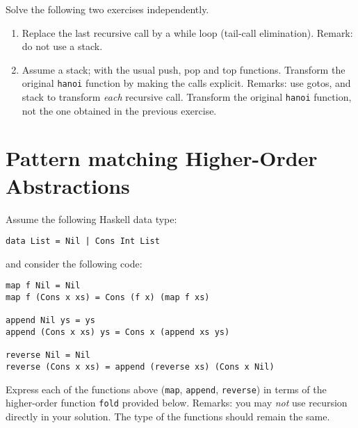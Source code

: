 \documentclass{article}
\newcommand{\answer}[1]{}
\begin{document}
Solve the following two exercises independently.
\begin{enumerate}
\item Replace the last recursive call by a while loop (tail-call
  elimination). Remark: do not use a stack. 
  \answer{
    \begin{verbatim}
    void move_many(int n, int source, int intermediate, int target) {
      while (n > 0) {
        move_many(n-1,source,target,intermediate);
        move_disk(source,target);
        n = n-1;
        swap(source,intermediate);
      }
    }
    \end{verbatim}}
\item Assume a stack; with the usual push, pop and top
  functions. Transform the original \texttt{hanoi} function by making
  the calls explicit. Remarks: use gotos, and stack to transform \emph{each}
  recursive call. Transform the original \texttt{hanoi} function, not
  the one obtained in the previous exercise. 
  \answer{
    \begin{verbatim}
      void move_many(int n, int s, int i, int d) {
        push(n,s,i,d,0);
      call:
        if (stk->n!=0) {
          push(stk->n-1,stk->s,stk->i,stk->d,1);
          goto call;
      loc1:
          move_disk(stk->s,stk->d);
          push(stk->n-1,stk->i,stk->s,stk->d,2);;
          goto call;
      loc2:
        }
        caller = stk->caller;
        pop();
        if (caller == 1) goto loc1;
        if (caller == 2) goto loc2;
      }
    \end{verbatim}
  }
\end{enumerate}
\section{Pattern matching Higher-Order Abstractions}

Assume the following Haskell data type:
\begin{verbatim}
data List = Nil | Cons Int List
\end{verbatim}
and consider the following code:
\begin{verbatim}
map f Nil = Nil
map f (Cons x xs) = Cons (f x) (map f xs)

append Nil ys = ys
append (Cons x xs) ys = Cons x (append xs ys)

reverse Nil = Nil
reverse (Cons x xs) = append (reverse xs) (Cons x Nil)
\end{verbatim}

Express each of the functions above (\texttt{map}, \texttt{append},
\texttt{reverse})  in terms of the higher-order
function \texttt{fold} provided below.  Remarks: you may \emph{not}
use recursion directly in your solution. The type of the functions
should remain the same.
\end{document}
